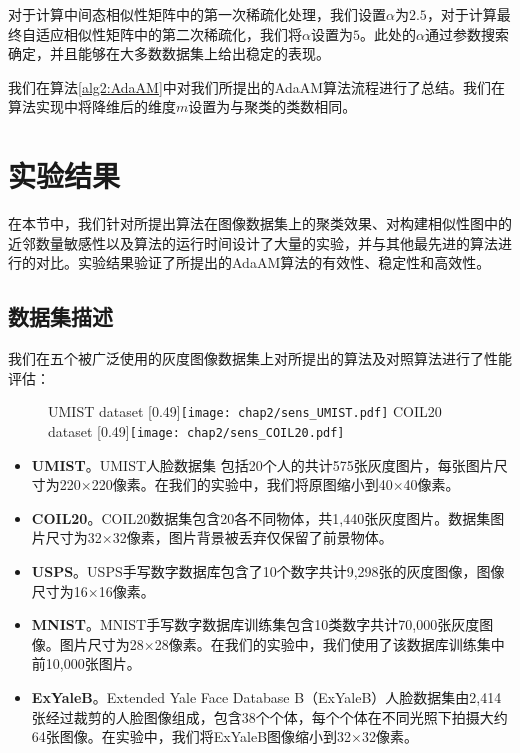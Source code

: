 对于计算中间态相似性矩阵中的第一次稀疏化处理，我们设置$\alpha$为$2.5$，对于计算最终自适应相似性矩阵中的第二次稀疏化，我们将$\alpha$设置为$5$。此处的$\alpha$通过参数搜索确定，并且能够在大多数数据集上给出稳定的表现。

我们在算法\ref{alg2:AdaAM}中对我们所提出的AdaAM算法流程进行了总结。我们在算法实现中将降维后的维度$m$设置为与聚类的类数相同。


\section{实验结果}
\label{sec2:Exp}
在本节中，我们针对所提出算法在图像数据集上的聚类效果、对构建相似性图中的近邻数量敏感性以及算法的运行时间设计了大量的实验，并与其他最先进的算法进行的对比。实验结果验证了所提出的AdaAM算法的有效性、稳定性和高效性。
\subsection{数据集描述}
我们在五个被广泛使用的灰度图像数据集上对所提出的算法及对照算法进行了性能评估：

\begin{figure}[t]
	\centering
					{UMIST dataset}
					[0.49\textwidth]{\texttt{[image: chap2/sens\_UMIST.pdf]}}
					{COIL20 dataset}
					[0.49\textwidth]{\texttt{[image: chap2/sens\_COIL20.pdf]}}
	\label{fig2:Sen}
\end{figure} 

\begin{itemize}
	\item {\textbf{UMIST}}。UMIST人脸数据集 \cite{graham1998characterising}包括20个人的共计575张灰度图片，每张图片尺寸为220$ \times $220像素。在我们的实验中，我们将原图缩小到40$ \times $40像素。
	\item {\textbf{COIL20}}。COIL20数据集\cite{nene1996columbia}包含20各不同物体，共1,440张灰度图片。数据集图片尺寸为32$\times$32像素，图片背景被丢弃仅保留了前景物体。
	\item {\textbf{USPS}}。USPS手写数字数据库\cite{hull1994database}包含了10个数字共计9,298张的灰度图像，图像尺寸为16$\times$16像素。
	\item {\textbf{MNIST}}。MNIST手写数字数据库\cite{lecun1998gradient}训练集包含10类数字共计70,000张灰度图像。图片尺寸为28$\times$28像素。在我们的实验中，我们使用了该数据库训练集中前10,000张图片。
	\item {\textbf{ExYaleB}}。Extended Yale Face Database B（ExYaleB）人脸数据集\cite{KCLee05}由2,414张经过裁剪的人脸图像组成，包含38个个体，每个个体在不同光照下拍摄大约64张图像。在实验中，我们将ExYaleB图像缩小到32$ \times $32像素。
\end{itemize}

